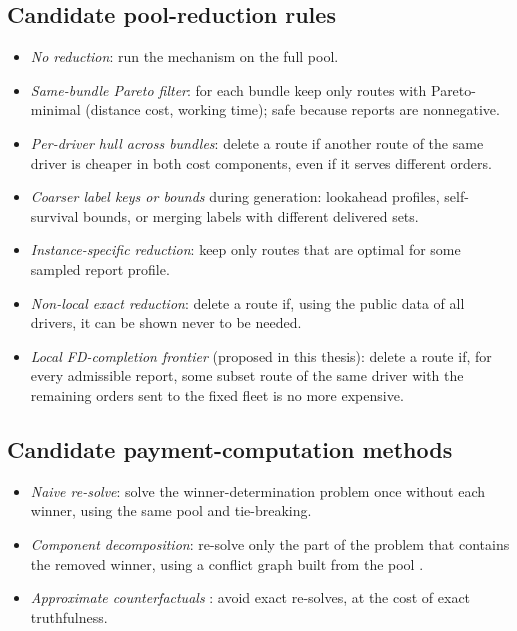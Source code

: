 \subsection{Candidate pool-reduction rules}

\begin{itemize}[leftmargin=*,itemsep=3pt]
\item \emph{No reduction}: run the mechanism on the full pool.
\item \emph{Same-bundle Pareto filter}: for each bundle keep only routes with
Pareto-minimal (distance cost, working time); safe because reports are
nonnegative.
\item \emph{Per-driver hull across bundles}: delete a route if another route
of the same driver is cheaper in both cost components, even if it serves
different orders.
\item \emph{Coarser label keys or bounds} during generation: lookahead
profiles, self-survival bounds, or merging labels with different delivered
sets.
\item \emph{Instance-specific reduction}: keep only routes that are optimal
for some sampled report profile.
\item \emph{Non-local exact reduction}: delete a route if, using the public
data of all drivers, it can be shown never to be needed.
\item \emph{Local FD-completion frontier} (proposed in this thesis): delete
a route if, for every admissible report, some subset route of the same
driver with the remaining orders sent to the fixed fleet is no more
expensive.
\end{itemize}

\subsection{Candidate payment-computation methods}

\begin{itemize}[leftmargin=*,itemsep=3pt]
\item \emph{Naive re-solve}: solve the winner-determination problem once
without each winner, using the same pool and tie-breaking.
\item \emph{Component decomposition}: re-solve only the part of the problem
that contains the removed winner, using a conflict graph built from the
pool \citep[in the spirit of][]{sandholm2005cabob,bunz2015faster}.
\item \emph{Approximate counterfactuals}
\citep{wilkens2012single,li2026auction}: avoid exact re-solves, at the cost of
exact truthfulness.
\end{itemize}
